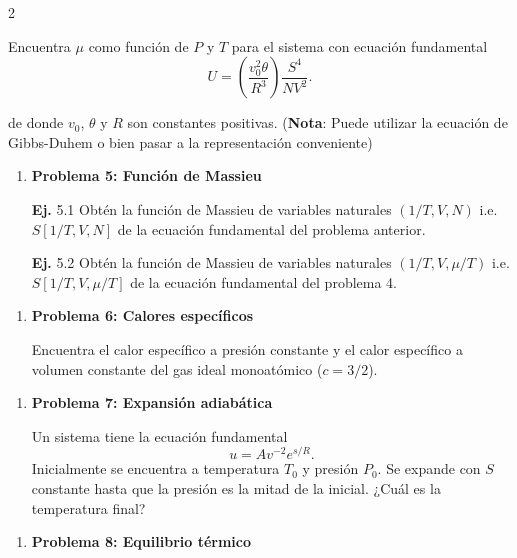 \documentclass{article}
\begin{document}
\begin{multicols}{2}
\begin{enumerate}[label={{\textcolor{trueblue}{\textbf{Ej}. \arabic*.0}}}, start=4]
Encuentra $\mu$ como función de $P$ y $T$ para el sistema con ecuación fundamental
\[
U = \left( \frac{v_0^2 \theta}{R^3} \right) \frac{S^4}{NV^2}.
\]

de donde $v_{0}$, $\theta$ y $R$ son constantes positivas. (\textbf{Nota}: Puede utilizar la ecuación de Gibbs-Duhem o  bien pasar a la representación conveniente)
\end{enumerate}


\begin{enumerate}[label={{\textcolor{trueblue}{\textbf{Ej}. \arabic*.0}}}, start=5]
\item \textbf{Problema 5: Función de Massieu}


\textcolor{trueblue}{\textbf{Ej.}} \textcolor{trueblue}{5.1} Obtén la función de Massieu de variables naturales $(1/T,V,N)$ i.e. $S[1/T,V,N]$ de la ecuación fundamental del problema anterior.


\textcolor{trueblue}{\textbf{Ej.}} \textcolor{trueblue}{5.2} Obtén la función de Massieu de variables naturales $(1/T,V,\mu/T)$ i.e. $S[1/T,V,\mu/T]$ de la ecuación fundamental del problema 4. 
\end{enumerate}


\begin{enumerate}[label={{\textcolor{trueblue}{\textbf{Ej}. \arabic*.0}}}, start=6]
\item \textbf{Problema 6: Calores específicos}


Encuentra el calor específico a presión constante y el calor específico a volumen constante del gas ideal monoatómico ($c=3/2$).
\end{enumerate}


\begin{enumerate}[label={{\textcolor{trueblue}{\textbf{Ej}. \arabic*.0}}}, start=7]
\item \textbf{Problema 7: Expansión adiabática}


Un sistema tiene la ecuación fundamental
\[
u = A v^{-2} e^{s/R}.
\]
Inicialmente se encuentra a temperatura $T_0$ y presión $P_0$. Se expande con $S$ constante hasta que la presión es la mitad de la inicial. ¿Cuál es la temperatura final?
\end{enumerate}


\begin{enumerate}[label={{\textcolor{trueblue}{\textbf{Ej}. \arabic*.0}}}, start=8]
\item \textbf{Problema 8: Equilibrio térmico}



\end{enumerate}
\end{multicols}
\end{document}
